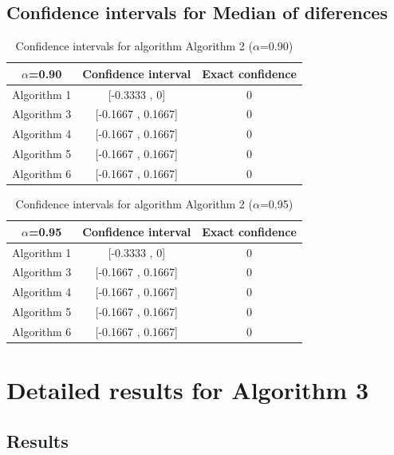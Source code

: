\documentclass[a4paper,10pt]{article}
\begin{document}
\subsection{Confidence intervals for Median of diferences}

\begin{table}[!htp]
\centering\small
\begin{tabular}{
|c|c|c|}
\hline
 $\alpha$=0.90 & Confidence interval & Exact confidence \\ \hline 
Algorithm 1 & [-0.3333 , 0] & 0\\ \hline 
Algorithm 3 & [-0.1667 , 0.1667] & 0\\ \hline 
Algorithm 4 & [-0.1667 , 0.1667] & 0\\ \hline 
Algorithm 5 & [-0.1667 , 0.1667] & 0\\ \hline 
Algorithm 6 & [-0.1667 , 0.1667] & 0\\ \hline 

\end{tabular}
\caption{Confidence intervals for algorithm Algorithm 2 ($\alpha$=0.90)}
\end{table}
\begin{table}[!htp]
\centering\small
\begin{tabular}{
|c|c|c|}
\hline
 $\alpha$=0.95 & Confidence interval & Exact confidence \\ \hline 
Algorithm 1 & [-0.3333 , 0] & 0\\ \hline 
Algorithm 3 & [-0.1667 , 0.1667] & 0\\ \hline 
Algorithm 4 & [-0.1667 , 0.1667] & 0\\ \hline 
Algorithm 5 & [-0.1667 , 0.1667] & 0\\ \hline 
Algorithm 6 & [-0.1667 , 0.1667] & 0\\ \hline 

\end{tabular}
\caption{Confidence intervals for algorithm Algorithm 2 ($\alpha$=0.95)}
\end{table}

 \clearpage 


\section{Detailed results for Algorithm 3}


\subsection{Results}
\end{document}
